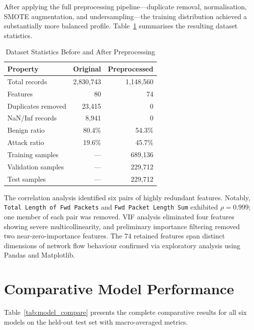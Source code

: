 After applying the full preprocessing pipeline---duplicate removal, normalisation, SMOTE augmentation, and undersampling---the training distribution achieved a substantially more balanced profile. Table~\ref{tab:preproc_stats_r} summarises the resulting dataset statistics.

\begin{table}[H]
\centering
\caption{Dataset Statistics Before and After Preprocessing}
\label{tab:preproc_stats_r}
\begin{tabular}{lrr}
\toprule
\textbf{Property} & \textbf{Original} & \textbf{Preprocessed} \\
\midrule
Total records         & 2{,}830{,}743 & 1{,}148{,}560 \\
Features              & 80            & 74            \\
Duplicates removed    & 23{,}415      & 0             \\
NaN/Inf records       & 8{,}941       & 0             \\
Benign ratio          & 80.4\%        & 54.3\%        \\
Attack ratio          & 19.6\%        & 45.7\%        \\
Training samples      & ---           & 689{,}136     \\
Validation samples    & ---           & 229{,}712     \\
Test samples          & ---           & 229{,}712     \\
\bottomrule
\end{tabular}
\end{table}

The correlation analysis identified six pairs of highly redundant features. Notably, \texttt{Total Length of Fwd Packets} and \texttt{Fwd Packet Length Sum} exhibited $\rho = 0.999$; one member of each pair was removed. VIF analysis eliminated four features showing severe multicollinearity, and preliminary importance filtering removed two near-zero-importance features. The 74 retained features span distinct dimensions of network flow behaviour confirmed via exploratory analysis using Pandas and Matplotlib.

\section{Comparative Model Performance}

Table~\ref{tab:model_compare} presents the complete comparative results for all six models on the held-out test set with macro-averaged metrics.

